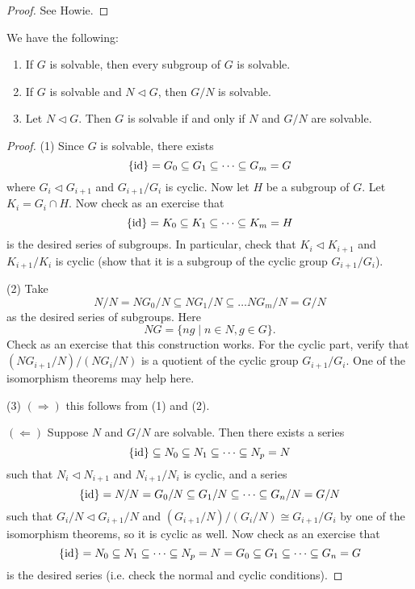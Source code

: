 \begin{proof}
  See Howie.
\end{proof}

\begin{theorem}
  We have the following:
  \begin{enumerate}
    \item If $G$ is solvable, then every subgroup
      of $G$ is solvable.
    \item If $G$ is solvable and $N \triangleleft G$,
      then $G / N$ is solvable.
    \item Let $N \triangleleft G$. Then
      $G$ is solvable if and only if
      $N$ and $G / N$ are solvable.
  \end{enumerate}
\end{theorem}

\begin{proof}
  (1) Since $G$ is solvable, there exists
  \[
    \{\mathrm{id}\} = G_0 \subseteq G_1 \subseteq \dots \subseteq G_m = G
  \]
  where $G_i \triangleleft G_{i + 1}$ and
  $G_{i + 1} / G_i$ is cyclic. Now let $H$ be a subgroup
  of $G$. Let $K_i = G_i \cap H$. Now check as an exercise
  that
  \[
    \{\mathrm{id}\} = K_0 \subseteq K_1 \subseteq \dots \subseteq K_m = H
  \]
  is the desired series of subgroups. In particular,
  check that
  $K_i \triangleleft K_{i + 1}$ and $K_{i + 1} / K_i$
  is cyclic (show that it is a subgroup of the cyclic
  group $G_{i + 1} / G_i$).

  (2) Take
  \[
    N / N = NG_0 / N \subseteq NG_1 / N \subseteq \dots NG_m / N = G / N
  \]
  as the desired series of subgroups. Here
  \[
    NG = \{ng \mid n \in N, g \in G\}.
  \]
  Check as an exercise that this construction works.
  For the cyclic part,
  verify that $(NG_{i + 1} / N) / (NG_i / N)$ is a
  quotient of the cyclic group $G_{i + 1} / G_i$.
  One of the isomorphism theorems may help here.

  (3) $(\Rightarrow)$ this follows from (1) and (2).

  $(\Leftarrow)$ Suppose $N$ and $G / N$ are solvable.
  Then there exists a series
  \[
    \{\mathrm{id}\} \subseteq N_0 \subseteq N_1 \subseteq \dots \subseteq N_p = N
  \]
  such that $N_i \triangleleft N_{i + 1}$ and
  $N_{i + 1} / N_i$ is cyclic, and a series
  \[
    \{\mathrm{id}\} = N / N = G_0 / N \subseteq G_1 / N
    \subseteq \dots \subseteq G_n / N = G / N
  \]
  such that $G_i / N \triangleleft G_{i + 1} / N$ and
  $(G_{i + 1} / N) / (G_i / N) \cong G_{i + 1} / G_i$
  by one of the isomorphism theorems, so it is cyclic as
  well. Now check as an exercise that
  \[
    \{\mathrm{id}\} = N_0 \subseteq N_1 \subseteq \dots \subseteq N_p = N
    = G_0 \subseteq G_1 \subseteq \dots \subseteq G_n = G
  \]
  is the desired series (i.e. check the normal and
  cyclic conditions).
\end{proof}

